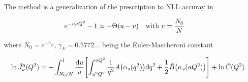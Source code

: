 \documentclass[../main.tex]{subfiles}
\begin{document}
The method is a generalization of the prescription to NLL accuray in \cite{CATANI19933}

\begin{equation}
    e^{-u \nu Q^2} - 1 \simeq -\Theta(u-v) \qq{with $v = \frac{N_0}{N}$}
\end{equation}

where $N_0 = e^{-\gamma_E}$, $\gamma_E = 0.5772 \dots $ being the Euler-Mascheroni constant

\begin{equation}\label{eq:master_formula alt}
    \ln \tilde{J}_\nu^q(Q^2) = - \int_{N_0/N}^{1} \frac{\dd u}{u} \qty[ \int_{u^2 Q^2}^{u Q^2} \frac{1}{q^2} A\qty(\alpha_s(q^2)) \dd q^2 + \frac{1}{2} \tilde{B}\qty(\alpha_s(u Q^2))] + \ln \tilde{C}(Q^2)
\end{equation}
\end{document}
